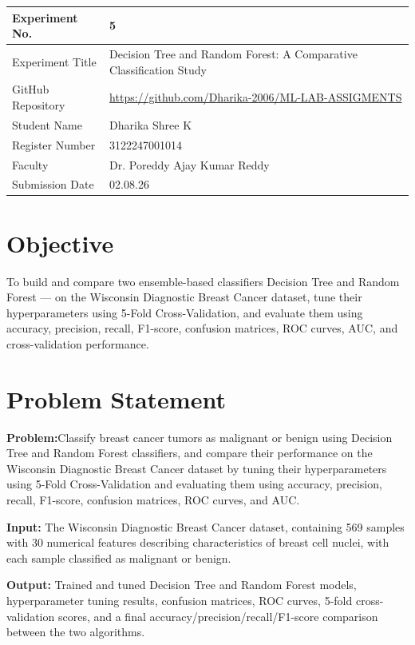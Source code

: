 \documentclass[12pt,a4paper]{article}
\begin{document}
\begin{tabular}{|p{4cm}|p{11cm}|}
\hline
Experiment No. & 5\\ \hline
Experiment Title & Decision Tree and Random Forest: A Comparative Classification Study\\ \hline
GitHub Repository & \url{https://github.com/Dharika-2006/ML-LAB-ASSIGMENTS} \\ \hline
Student Name & Dharika Shree K\\ \hline
Register Number & 3122247001014\\ \hline
Faculty & Dr. Poreddy Ajay Kumar Reddy \\ \hline
Submission Date & 02.08.26\\ \hline
\end{tabular}
\section{Objective}
To build and compare two ensemble-based classifiers Decision Tree and Random Forest — on the Wisconsin Diagnostic Breast Cancer dataset, tune their hyperparameters using 5-Fold Cross-Validation, and evaluate them using accuracy, precision, recall, F1-score, confusion matrices, ROC curves, AUC, and cross-validation performance.

\section{Problem Statement}
\textbf{Problem:}Classify breast cancer tumors as malignant or benign using Decision Tree and Random Forest classifiers, and compare their performance on the Wisconsin Diagnostic Breast Cancer dataset by tuning their hyperparameters using 5-Fold Cross-Validation and evaluating them using accuracy, precision, recall, F1-score, confusion matrices, ROC curves, and AUC.

\textbf{Input:} The Wisconsin Diagnostic Breast Cancer dataset, containing 569 samples with 30 numerical features describing characteristics of breast cell nuclei, with each sample classified as malignant or benign.

\textbf{Output:} Trained and tuned Decision Tree and Random Forest models, hyperparameter tuning results, confusion matrices, ROC curves, 5-fold cross-validation scores, and a final accuracy/precision/recall/F1-score comparison between the two algorithms.
\end{document}
